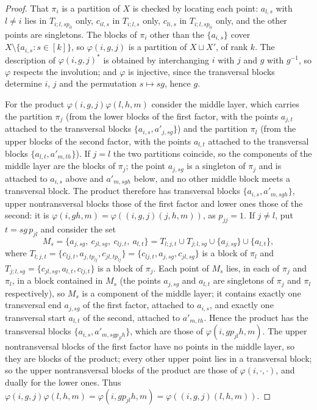 \documentclass[11pt]{amsart}
\theoremstyle{definition}
\begin{document}
\begin{proof}
That $\pi_i$ is a partition of $X$ is checked by locating each point: $a_{l,s}$ with $l\ne i$ lies in $T_{i;l,sp_{li}}$ only, $c_{il,s}$ in $T_{i;l,s}$ only, $c_{li,s}$ in $T_{i;l,sp_{li}}$ only, and the other points are singletons. The blocks of $\pi_i$ other than the $\{a_{i,s}\}$ cover $X\setminus\{a_{i,s}:s\in[k]\}$, so $\varphi(i,g,j)$ is a partition of $X\sqcup X'$, of rank $k$. The description of $\varphi(i,g,j)^*$ is obtained by interchanging $i$ with $j$ and $g$ with $g^{-1}$, so $\varphi$ respects the involution; and $\varphi$ is injective, since the transversal blocks determine $i$, $j$ and the permutation $s\mapsto sg$, hence $g$.

For the product $\varphi(i,g,j)\varphi(l,h,m)$ consider the middle layer, which carries the partition $\pi_j$ (from the lower blocks of the first factor, with the points $a_{j,t}$ attached to the transversal blocks $\{a_{i,s},a'_{j,sg}\}$) and the partition $\pi_l$ (from the upper blocks of the second factor, with the points $a_{l,t}$ attached to the transversal blocks $\{a_{l,t},a'_{m,th}\}$). If $j=l$ the two partitions coincide, so the components of the middle layer are the blocks of $\pi_j$; the point $a_{j,sg}$ is a singleton of $\pi_j$ and is attached to $a_{i,s}$ above and $a'_{m,sgh}$ below, and no other middle block meets a transversal block. The product therefore has transversal blocks $\{a_{i,s},a'_{m,sgh}\}$, upper nontransversal blocks those of the first factor and lower ones those of the second: it is $\varphi(i,gh,m)=\varphi((i,g,j)(j,h,m))$, as $p_{jj}=1$. If $j\ne l$, put $t=sg\,p_{jl}$ and consider the set
\[
M_s=\{a_{j,sg},\ c_{jl,sg},\ c_{lj,t},\ a_{l,t}\}=T_{l;j,t}\cup T_{j;l,sg}\cup\{a_{j,sg}\}\cup\{a_{l,t}\},
\]
where $T_{l;j,t}=\{c_{lj,t},a_{j,tp_{lj}},c_{jl,tp_{lj}}\}=\{c_{lj,t},a_{j,sg},c_{jl,sg}\}$ is a block of $\pi_l$ and $T_{j;l,sg}=\{c_{jl,sg},a_{l,t},c_{lj,t}\}$ is a block of $\pi_j$. Each point of $M_s$ lies, in each of $\pi_j$ and $\pi_l$, in a block contained in $M_s$ (the points $a_{j,sg}$ and $a_{l,t}$ are singletons of $\pi_j$ and $\pi_l$ respectively), so $M_s$ is a component of the middle layer; it contains exactly one transversal end $a_{j,sg}$ of the first factor, attached to $a_{i,s}$, and exactly one transversal start $a_{l,t}$ of the second, attached to $a'_{m,th}$. Hence the product has the transversal blocks $\{a_{i,s},a'_{m,sgp_{jl}h}\}$, which are those of $\varphi(i,gp_{jl}h,m)$. The upper nontransversal blocks of the first factor have no points in the middle layer, so they are blocks of the product; every other upper point lies in a transversal block; so the upper nontransversal blocks of the product are those of $\varphi(i,\cdot,\cdot)$, and dually for the lower ones. Thus $\varphi(i,g,j)\varphi(l,h,m)=\varphi(i,gp_{jl}h,m)=\varphi((i,g,j)(l,h,m))$.
\end{proof}
\end{document}
